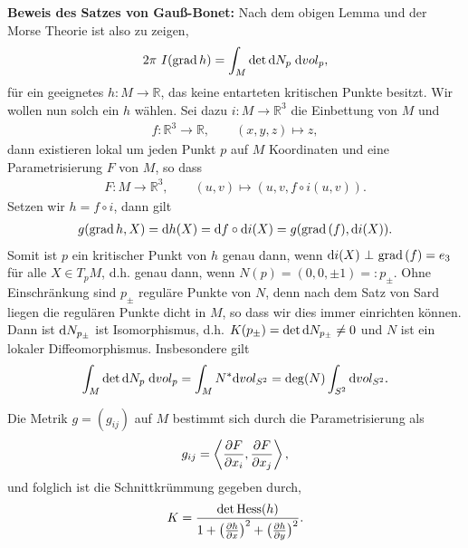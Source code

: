 \documentclass[12pt,a4paper]{article}
\def\R{\mathbb{R}}
\def\grad{\mathrm{grad}\,}
\begin{document}
{\bf Beweis des Satzes von Gau\ss{}-Bonet:}
Nach dem obigen Lemma und der Morse Theorie ist also zu zeigen,
\begin{align*}
2\pi\ I(\grad h) = \int_M \det\diffd N_p\;\dvol_p, 
\end{align*}
f\"ur ein geeignetes $h: M\to \R$, das keine entarteten kritischen
Punkte besitzt. Wir wollen nun solch ein $h$ w\"ahlen. 
Sei dazu $i:M\to \R^3$ die Einbettung von $M$ und
\begin{align*}
f: \R^3\to \R,\qquad (x,y,z)\mapsto z,
\end{align*}
dann existieren lokal um jeden Punkt $p$ auf $M$ Koordinaten
und eine Parametrisierung $F$ von $M$, so dass
\begin{align*}
F: M\to \R^3,\qquad (u,v) \mapsto (u,v,f\circ i(u,v)).
\end{align*}
Setzen wir $h=f\circ i$, dann gilt
\begin{align*}
g(\grad h,X) = \diffd h(X) = 
\diffd f\circ \diffd i(X)
= g(\grad(f),\diffd i(X)).
\end{align*}
Somit ist $p$ ein kritischer Punkt von $h$ genau dann, wenn $\diffd i(X)\ \bot\
\grad(f) = e_3$ f\" ur alle $X\in T_pM$, d.h. genau dann, wenn $N(p) = (0,0,\pm
1) =: p_{\pm}$. Ohne Einschr\"ankung sind $p_\pm$ regul\"are Punkte von $N$, denn nach dem Satz von
Sard liegen die regul\"aren Punkte dicht in $M$, so dass wir dies immer einrichten
k\"onnen. Dann ist $\mathrm{d} N_{p_\pm}$ ist Isomorphismus, d.h. $K(p_{\pm}) = \det
\mathrm{d} N_{p_\pm} \neq 0$ und $N$ ist ein lokaler Diffeomorphismus. Insbesondere
gilt
\begin{align*}
\int_M \det \mathrm{d} N_p\;\mathrm{d}vol_p = \int_{M} N^* \mathrm{d}vol_{S^2} = 
\deg(N) \int_{S^2} \mathrm{d}vol_{S^2}.
\end{align*}

\medskip

Die Metrik $g = (g_{ij})$ auf $M$ bestimmt sich durch die Parametrisierung
als
\begin{align*}
g_{ij} = \left\langle\frac{\partial F}{\partial x_i},\frac{\partial F}{\partial x_j}\right\rangle,
\end{align*}
und folglich ist die Schnittkr\"ummung gegeben durch,
\begin{align*}
K = \frac{\det \mathrm{Hess}(h)}{1 + \left(\frac{\partial h}{\partial
x}\right)^2+\big(\frac{\partial h}{\partial y}\big)^2}.
\end{align*}
\end{document}
